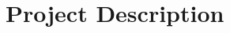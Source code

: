 \documentclass[11pt,phd]{byuprop}
\begin{document}
\section{Project Description}

%
%
%
%
\end{document}
